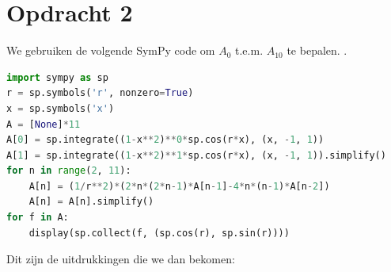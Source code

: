 \documentclass[12pt,a4paper]{article}
\theoremstyle{definition}
\numberwithin{equation}{section}
\begin{document}
\section*{Opdracht 2}
We gebruiken de volgende SymPy code om $A_0$ t.e.m. $A_{10}$ te bepalen. \footnotemark{}.
\begin{lstlisting}[language=Python]
import sympy as sp
r = sp.symbols('r', nonzero=True)
x = sp.symbols('x')
A = [None]*11
A[0] = sp.integrate((1-x**2)**0*sp.cos(r*x), (x, -1, 1))
A[1] = sp.integrate((1-x**2)**1*sp.cos(r*x), (x, -1, 1)).simplify()
for n in range(2, 11):
    A[n] = (1/r**2)*(2*n*(2*n-1)*A[n-1]-4*n*(n-1)*A[n-2])
    A[n] = A[n].simplify()
for f in A:
    display(sp.collect(f, (sp.cos(r), sp.sin(r)))) 
\end{lstlisting}
Dit zijn de uitdrukkingen die we dan bekomen:
\end{document}
